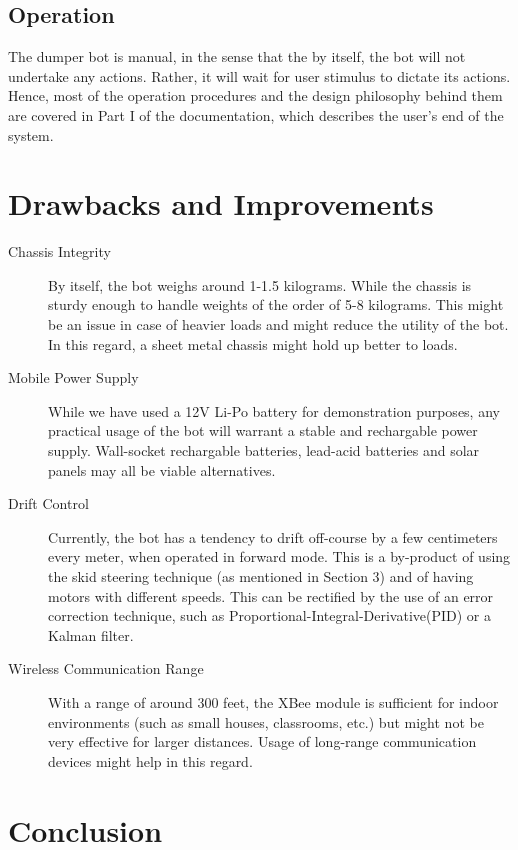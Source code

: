 \documentclass[a4paper]{article}
\begin{document}
\subsection{Operation}

The dumper bot is manual, in the sense that the by itself, the bot will not undertake any actions. Rather, it will wait for user stimulus to dictate its actions. Hence, most of the operation procedures and the design philosophy behind them are covered in Part I of the documentation, which describes the user's end of the system. 

\section{Drawbacks and Improvements}

\begin{description}
\item[Chassis Integrity] By itself, the bot weighs around 1-1.5 kilograms. While the chassis is sturdy enough to handle weights of the order of 5-8 kilograms. This might be an issue in case of heavier loads and might reduce the utility of the bot. In this regard, a sheet metal chassis might hold up better to loads.

\item[Mobile Power Supply] While we have used a 12V Li-Po battery for demonstration purposes, any practical usage of the bot will warrant a stable and rechargable power supply. Wall-socket rechargable batteries, lead-acid batteries and solar panels may all be viable alternatives.

\item[Drift Control] Currently, the bot has a tendency to drift off-course by a few centimeters every meter, when operated in forward mode. This is a by-product of using the skid steering technique (as mentioned in Section 3) and of having motors with different speeds. This can be rectified by the use of an error correction technique, such as Proportional-Integral-Derivative(PID) or a Kalman filter.

\item[Wireless Communication Range] With a range of around 300 feet, the XBee module is sufficient for indoor environments (such as small houses, classrooms, etc.) but might not be very effective for larger distances. Usage of long-range communication devices might help in this regard.
\end{description}

\section{Conclusion}
\end{document}
